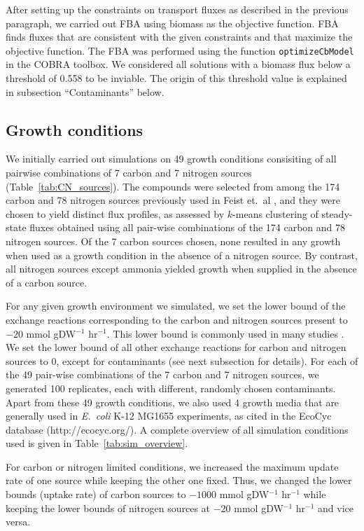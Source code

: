 \documentclass[12pt]{article}
\begin{document}
After setting up the constraints on transport fluxes as described in the previous paragraph, we carried out FBA using biomass as the objective function. FBA finds fluxes that are consistent with the given constraints and that maximize the objective function. The FBA was performed using the function \texttt{optimizeCbModel} in the COBRA toolbox. We considered all solutions with a biomass flux below a threshold of 0.558 to be inviable. The origin of this threshold value is explained in subsection ``Contaminants'' below.

\subsection*{Growth conditions} 
We initially carried out simulations on 49 growth conditions consisiting of all pairwise combinations of 7 carbon and 7 nitrogen sources (Table~\ref{tab:CN_sources}). The compounds were selected from among the 174 carbon and 78 nitrogen sources previously used in Feist et.\ al \cite{Feistetal2007}, and they were chosen to yield distinct flux profiles, as assessed by $k$-means clustering of steady-state fluxes obtained using all pair-wise combinations of the 174 carbon and 78 nitrogen sources. Of the 7 carbon sources chosen, none resulted in any growth when used as a growth condition in the absence of a nitrogen source. By contrast, all nitrogen sources except ammonia yielded growth when supplied in the absence of a carbon source.

For any given growth environment we simulated, we set the lower bound of the exchange reactions corresponding to the carbon and nitrogen sources present to $-20$ mmol gDW$^{-1}$ hr$^{-1}$. This lower bound is commonly used in many studies \cite{Feistetal2007}. We set the lower bound of all other exchange reactions for carbon and nitrogen sources to 0, except for contaminants (see next subsection for details). For each of the 49 pair-wise combinations of the 7 carbon and 7 nitrogen sources, we generated 100 replicates, each with different, randomly chosen contaminants. Apart from these 49 growth conditions, we also used 4 growth media that are generally used in \emph{E.\ coli} K-12 MG1655 experiments, as cited in the EcoCyc database (http://ecocyc.org/). A complete overview of all simulation conditions used is given in Table~\ref{tab:sim_overview}.

For carbon or nitrogen limited conditions, we increased the maximum update rate of one source while keeping the other one fixed. Thus, we changed the lower bounds (uptake rate) of carbon sources to $-1000$ mmol gDW$^{-1}$ hr$^{-1}$ while keeping the lower bounds of nitrogen sources at $-20$ mmol gDW$^{-1}$ hr$^{-1}$ and vice versa. 
\end{document}
